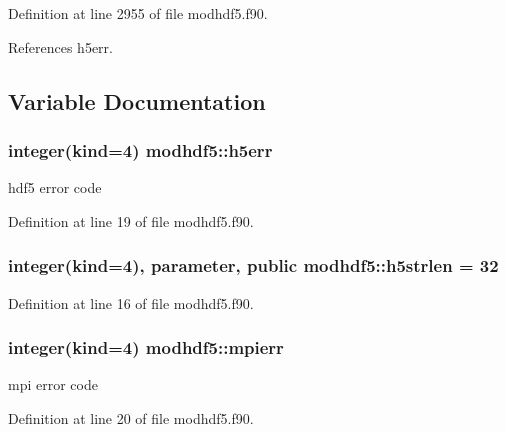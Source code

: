 Definition at line 2955 of file modhdf5.\+f90.



References h5err.



\subsection{Variable Documentation}
\subsubsection[{\texorpdfstring{h5err}{h5err}}]{\setlength{\rightskip}{0pt plus 5cm}integer(kind=4) modhdf5\+::h5err\hspace{0.3cm}{\ttfamily [private]}}\hypertarget{namespacemodhdf5_a7c21e772a564aec00e44e46562e9e840}{}\label{namespacemodhdf5_a7c21e772a564aec00e44e46562e9e840}


hdf5 error code 



Definition at line 19 of file modhdf5.\+f90.

\subsubsection[{\texorpdfstring{h5strlen}{h5strlen}}]{\setlength{\rightskip}{0pt plus 5cm}integer(kind=4), parameter, public modhdf5\+::h5strlen = 32}\hypertarget{namespacemodhdf5_a74fed11716b5063ece33a584a5872f7a}{}\label{namespacemodhdf5_a74fed11716b5063ece33a584a5872f7a}


Definition at line 16 of file modhdf5.\+f90.

\subsubsection[{\texorpdfstring{mpierr}{mpierr}}]{\setlength{\rightskip}{0pt plus 5cm}integer(kind=4) modhdf5\+::mpierr\hspace{0.3cm}{\ttfamily [private]}}\hypertarget{namespacemodhdf5_a8d55ad41fc659457afec426d7eb3b2e8}{}\label{namespacemodhdf5_a8d55ad41fc659457afec426d7eb3b2e8}


mpi error code 



Definition at line 20 of file modhdf5.\+f90.

